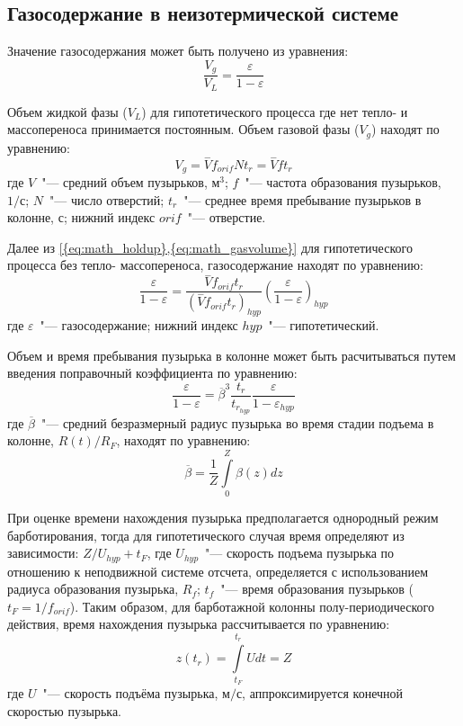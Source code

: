 \subsection{Газосодержание в неизотермической системе}

Значение газосодержания может быть получено из уравнения:
\begin{equation}
\frac{V_g}{V_{L}}=\frac{\varepsilon}{1-\varepsilon}\label{eq:math_holdup}
\end{equation}

Объем жидкой фазы (\(V_{L}\)) для гипотетического процесса где нет тепло- и массопереноса принимается постоянным. 
Объем газовой фазы (\(V_{g}\)) находят по уравнению:
\begin{equation}
  {V}_{g}=\stackrel{-}{V}{f}_{orif}N{t}_{r}=\stackrel{-}{V}f{t}_{r}\label{eq:math_gasvolume} 
\end{equation}
где \(V\)~"--- средний объем пузырьков, \(м^{3}\);
\(f\)~"--- частота образования пузырьков, \(1/с\);
\(N\)~"--- число отверстий;
\({t}_{r}\)~"--- среднее время пребывание пузырьков в колонне, \(с\);
нижний индекс \({orif}\)~"--- отверстие.

Далее из \cref{{eq:math_holdup},{eq:math_gasvolume}} для гипотетического процесса без тепло- массопереноса, газосодержание находят по уравнению: \begin{equation}
 \frac{\varepsilon }{1-\varepsilon }= \frac{ \stackrel{-}{V}{f}_{orif}{t}_{r}}{\left({\stackrel{-}{V}f}_{orif}{t}_{r}\right)_{hyp}}\left(\frac{\varepsilon}{1-{\varepsilon }}\right)_{hyp} 
\end{equation}
где \(\varepsilon\)~"--- газосодержание;
нижний индекс \({hyp}\)~"--- гипотетический.

Объем и время пребывания пузырька в колонне может быть
расчитываться путем введения поправочный коэффициента по уравнению:
\begin{equation} 
\frac{\varepsilon }{1-\varepsilon }=\overline{\beta}^{3} \frac{{t}_{r}}{{t}_{{r}_{hyp }}}\frac{{\varepsilon }}{1-{\varepsilon }_{hyp}} \end{equation}
где \(\overline{\beta}\)~"--- средний безразмерный радиус пузырька во время стадии подъема в колонне, \(R(t)/R_{F}\), находят по уравнению:
\begin{equation} 
 \overline{\beta}=\frac{1}{Z}\underset{0}{\overset{Z}{\int }}\beta \left(z\right)dz
\end{equation} 

При оценке времени нахождения пузырька предполагается однородный режим барботирования, тогда для гипотетического случая время определяют из зависимости: \(Z/U_{hyp}+t_{F}\), где \(U_{hyp}\)~"--- скорость подъема пузырька по отношению к неподвижной системе отсчета,
определяется с использованием радиуса образования пузырька, \(R_{f}\); \(t_{f}\)~"--- время  образования пузырьков (\(t_{F}=1/f_{orif}\)).
Таким образом, для барботажной колонны полу-периодического действия, время нахождения пузырька рассчитывается по уравнению: 
\begin{equation}  
 z\left({t}_{r}\right)=\underset{{t}_{F}}{\overset{{t}_{r}}{\int }}Udt=Z 
\end{equation}
где \(U\)~"--- скорость подъёма пузырька, \(м/с\), аппроксимируется конечной скоростью пузырька.

